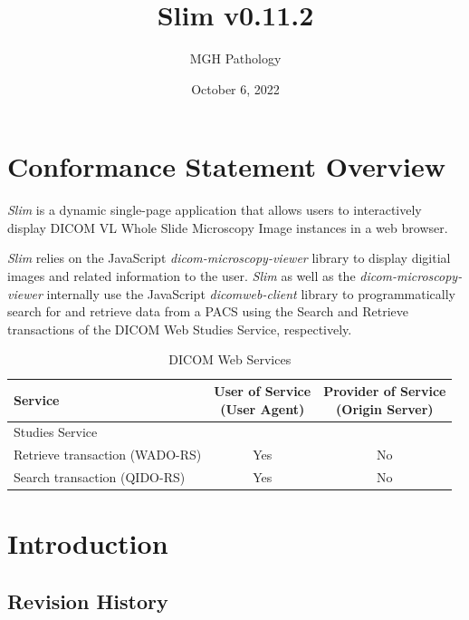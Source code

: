 \documentclass[12pt, letterpaper]{article}
\title{Slim v0.11.2}
\author{MGH Pathology}
\date{October 6, 2022}
\begin{document}
\begin{titlepage}
    \maketitle
\end{titlepage}


\section*{Conformance Statement Overview}

\emph{Slim} is a dynamic single-page application that allows users to interactively display \gls{DICOM} \gls{VL} Whole Slide Microscopy Image instances in a web browser.

\emph{Slim} relies on the JavaScript \emph{dicom-microscopy-viewer} library to display digitial images and related information to the user.
\emph{Slim} as well as the \emph{dicom-microscopy-viewer} internally use the JavaScript \emph{dicomweb-client} library to programmatically search for and retrieve data from a \gls{PACS} using the Search and Retrieve transactions of the \gls{DICOM} Web Studies Service, respectively.

\begin{table}[h!]
    \center
    \begin{tabular}{ |l|c|c| }
        \hline
        Service & \thead{User of Service \\ (User Agent)} & \thead{Provider of Service \\ (Origin Server)} \\
        \hline\hline
        \multicolumn{3}{|l|}{Studies Service} \\
        \hline
        Retrieve transaction (WADO-RS) & Yes & No \\
        \hline
        Search transaction (QIDO-RS) & Yes & No \\
        \hline
    \end{tabular}
    \caption{DICOM Web Services}
    \label{table:1}
\end{table}

\tableofcontents

\section{Introduction}

\subsection{Revision History}
\end{document}
